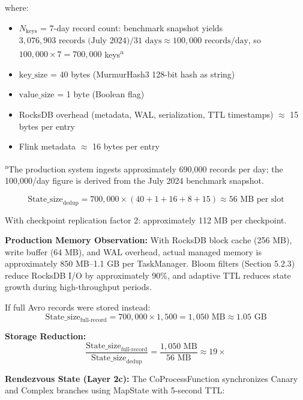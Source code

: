 where:
\begin{itemize}
    \item $N_{\text{keys}}$ = 7-day record count: benchmark snapshot yields $3{,}076{,}903 \text{ records (July 2024)} / 31 \text{ days} \approx 100{,}000 \text{ records/day}$, so $100{,}000 \times 7 = 700{,}000$ keys\textsuperscript{a}
    \item $\text{key\_size}$ = 40 bytes (MurmurHash3 128-bit hash as string)
    \item $\text{value\_size}$ = 1 byte (Boolean flag)
    \item RocksDB overhead (metadata, WAL, serialization, TTL timestamps) $\approx$ 15 bytes per entry
    \item Flink metadata $\approx$ 16 bytes per entry
\end{itemize}
\addtocounter{footnote}{1}\textsuperscript{a}The production system ingests approximately 690,000 records per day; the 100,000/day figure is derived from the July 2024 benchmark snapshot.

\begin{equation}
\text{State\_size}_{\text{dedup}} = 700{,}000 \times (40 + 1 + 16 + 8 + 15) \approx 56 \text{ MB per slot}
\end{equation}

With checkpoint replication factor 2: approximately 112 MB per checkpoint.

\textbf{Production Memory Observation:} With RocksDB block cache (256 MB), write buffer (64 MB), and WAL overhead, actual managed memory is approximately 850 MB--1.1 GB per TaskManager. Bloom filters (Section 5.2.3) reduce RocksDB I/O by approximately 90\%, and adaptive TTL reduces state growth during high-throughput periods.

If full Avro records were stored instead:
\begin{equation}
\text{State\_size}_{\text{full-record}} = 700{,}000 \times 1{,}500 = 1{,}050 \text{ MB} \approx 1.05 \text{ GB}
\end{equation}

\textbf{Storage Reduction:}
\begin{equation}
\frac{\text{State\_size}_{\text{full-record}}}{\text{State\_size}_{\text{dedup}}} = \frac{1{,}050 \text{ MB}}{56 \text{ MB}} \approx 19\times
\end{equation}

\textbf{Rendezvous State (Layer 2c):} The CoProcessFunction synchronizes Canary and Complex branches using MapState with 5-second TTL:

